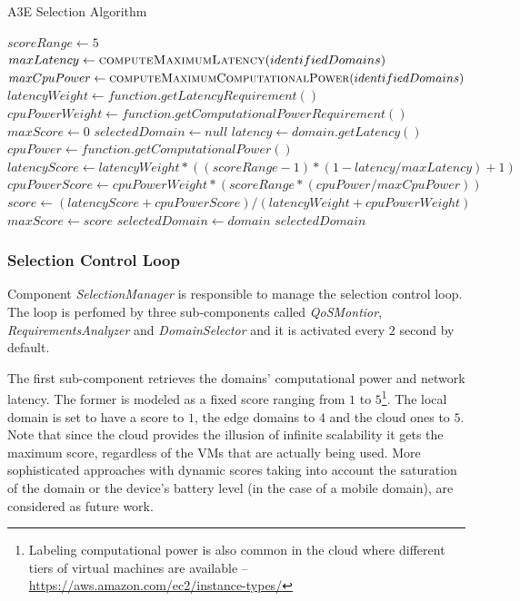 \begin{algorithm}[b]
	\caption{A3E Selection Algorithm}
	\label{alg:selection}
	\begin{algorithmic}[1]
		
		\State$scoreRange \gets 5$
		\State $maxLatency \gets \Call{computeMaximumLatency}{identifiedDomains}$
		\State $maxCpuPower \gets \Call{computeMaximumComputationalPower}{identifiedDomains}$
		\State $latencyWeight \gets function.getLatencyRequirement()$ 
		\State $cpuPowerWeight \gets function.getComputationalPowerRequirement()$ 
		\State $maxScore \gets 0$
		\State $selectedDomain \gets null$
		\State $latency \gets domain.getLatency()$ 
		\State $cpuPower \gets function.getComputationalPower()$ 
		\State $latencyScore \gets latencyWeight*((scoreRange-1)*(1 - latency/maxLatency)+1)$ 
		\State $cpuPowerScore \gets cpuPowerWeight*(scoreRange*(cpuPower/maxCpuPower))$
		\State $score \gets (latencyScore + cpuPowerScore) / (latencyWeight + cpuPowerWeight)$
		\State $maxScore \gets score$
		\State $selectedDomain \gets domain$
		\EndIf
		\EndFor 
		\State \Return $selectedDomain$
		\EndFunction
	\end{algorithmic}
\end{algorithm}

\subsubsection{Selection Control Loop}

Component \textit{SelectionManager} is responsible to manage the selection control loop. The loop is perfomed by three sub-components called \textit{QoSMontior}, \textit{RequirementsAnalyzer} and \textit{DomainSelector} and it is activated every $2$ second by default.

The first sub-component retrieves the domains' computational power and network latency. The former is modeled as a fixed score ranging from $1$ to $5$\footnote{Labeling computational power is also common in the cloud where different tiers of virtual machines are available -- \url{https://aws.amazon.com/ec2/instance-types/}}. The local domain is set to have a score to $1$, the edge domains to $4$ and the cloud ones to $5$. Note that since the cloud provides the illusion of infinite scalability it gets the maximum score, regardless of the VMs that are actually being used. More sophisticated approaches with dynamic scores taking into account the saturation of the domain or the device's battery level (in the case of a mobile domain), are considered as future work.  
 

